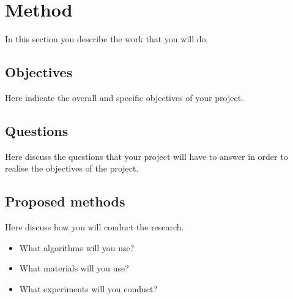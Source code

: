 \section{Method}

In this section you describe the work that you will do.

\subsection{Objectives}

Here indicate the overall and specific objectives of your project.


\subsection{Questions}

Here discuss the questions that your project will have to answer in order to realise the objectives of the project.


\subsection{Proposed methods}

Here discuss how you will conduct the research. 

\begin{itemize}
\item What algorithms will you use?
\item What materials will you use?
\item What experiments will you conduct?
\end{itemize}
 